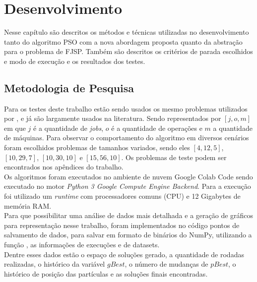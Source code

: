 \chapter{Desenvolvimento}
    Nesse capítulo são descritos os métodos e técnicas utilizadas no desenvolvimento tanto do algoritmo PSO com a nova abordagem proposta quanto da abstração para o problema de FJSP. Também são descritos os critérios de parada escolhidos e modo de execução e os resultados dos testes.


\section{Metodologia de Pesquisa}
Para os testes deste trabalho estão sendo usados os mesmo problemas utilizados por \cite{Kacem2002}, e já são largamente usados na literatura. Sendo representados por $[j, o, m]$ em que $j$ é a quantidade de \textit{jobs}, $o$ é a quantidade de operações e $m$ a quantidade de máquinas. Para observar o comportamento do algoritmo em diversos cenários foram escolhidos problemas de tamanhos variados, sendo eles $[4, 12, 5]$, $[10, 29, 7]$, $[10, 30, 10]$ e $[15, 56, 10]$. Os problemas de teste podem ser encontrados nos apêndices do trabalho.\\
%
\indent Os algoritmos foram executados no ambiente de nuvem Google Colab Code sendo executado no motor \textit{Python 3 Google Compute Engine Backend}. Para a execução foi utilizado um \textit{runtime} com processadores comuns (CPU) e 12 Gigabytes de memória RAM.\\
%
%
\indent Para que possibilitar uma análise de dados mais detalhada e a geração de gráficos para representação nesse trabalho, foram implementados no código pontos de salvamento de dados, para salvar em formato de binários do NumPy, utilizando a função , as informações de execuções e de datasets.\\
\indent Dentre esses dados estão o espaço de soluções gerado, a quantidade de rodadas realizadas, o histórico da variável $gBest$, o número de mudanças de $pBest$, o histórico de posição das partículas e as soluções finais encontradas.


